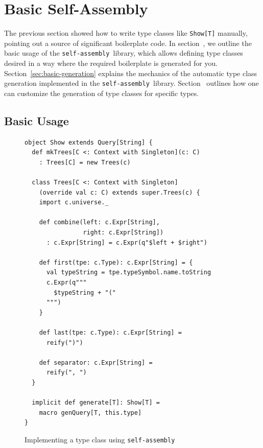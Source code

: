 \documentclass[preprint]{sigplanconf}
\newcommand{\selfassembly}{\texttt{self-assembly~}}
\begin{document}


\section{Basic Self-Assembly}
\label{sec:basic-self-assembly}


The previous section showed how to write type classes like \verb|Show[T]|
manually, pointing out a source of significant boilerplate code. In
section~\cite{sec:basic-usage}, we outline the basic usage of the
\selfassembly library, which allows defining type classes desired in a way
where the required boilerplate is generated for you.
Section~\ref{sec:basic-generation} explains the mechanics of the automatic
type class generation implemented in the \selfassembly library.
Section~\cite{sec:customization} outlines how one can customize the generation
of type classes for specific types.

\subsection{Basic Usage}
\label{sec:basic-usage}

\begin{figure}
\centering
\begin{lstlisting}
object Show extends Query[String] {
  def mkTrees[C <: Context with Singleton](c: C)
    : Trees[C] = new Trees(c)

  class Trees[C <: Context with Singleton]
    (override val c: C) extends super.Trees(c) {
    import c.universe._

    def combine(left: c.Expr[String],
                right: c.Expr[String])
      : c.Expr[String] = c.Expr(q"$left + $right")

    def first(tpe: c.Type): c.Expr[String] = {
      val typeString = tpe.typeSymbol.name.toString
      c.Expr(q"""
        $typeString + "("
      """)
    }

    def last(tpe: c.Type): c.Expr[String] =
      reify(")")

    def separator: c.Expr[String] =
      reify(", ")
  }

  implicit def generate[T]: Show[T] =
    macro genQuery[T, this.type]
}
\end{lstlisting}
  \caption{Implementing a type class using \selfassembly}
  \label{fig:basic-usage}
\end{figure}
\end{document}

